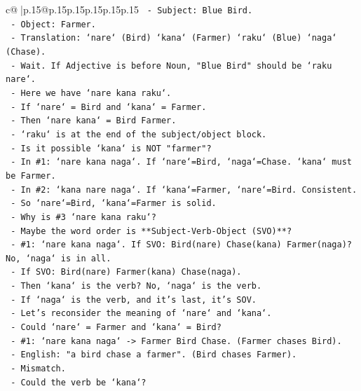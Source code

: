 \documentclass{article}
\begin{document}
{\begin{supertabular}{c@{$\;$}|p{.15\linewidth}@{}p{.15\linewidth}p{.15\linewidth}p{.15\linewidth}p{.15\linewidth}p{.15\linewidth}}
{{{\texttt{    {-} Subject: Blue Bird.} \\
\texttt{    {-} Object: Farmer.} \\
\texttt{    {-} Translation: `nare` (Bird) `kana` (Farmer) `raku` (Blue) `naga` (Chase).} \\
\texttt{    {-} Wait. If Adjective is before Noun, "Blue Bird" should be `raku nare`.} \\
\texttt{    {-} Here we have `nare kana raku`.} \\
\texttt{    {-} If `nare` = Bird and `kana` = Farmer.} \\
\texttt{    {-} Then `nare kana` = Bird Farmer.} \\
\texttt{    {-} `raku` is at the end of the subject/object block.} \\
\texttt{    {-} Is it possible `kana` is NOT "farmer"?} \\
\texttt{      {-} In \#1: `nare kana naga`. If `nare`=Bird, `naga`=Chase. `kana` must be Farmer.} \\
\texttt{      {-} In \#2: `kana nare naga`. If `kana`=Farmer, `nare`=Bird. Consistent.} \\
\texttt{    {-} So `nare`=Bird, `kana`=Farmer is solid.} \\
\texttt{    {-} Why is \#3 `nare kana raku`?} \\
\texttt{    {-} Maybe the word order is **Subject{-}Verb{-}Object (SVO)**?} \\
\texttt{      {-} \#1: `nare kana naga`. If SVO: Bird(nare) Chase(kana) Farmer(naga)? No, `naga` is in all.} \\
\texttt{      {-} If SVO: Bird(nare) Farmer(kana) Chase(naga).} \\
\texttt{        {-} Then `kana` is the verb? No, `naga` is the verb.} \\
\texttt{        {-} If `naga` is the verb, and it's last, it's SOV.} \\
\texttt{    {-} Let's reconsider the meaning of `nare` and `kana`.} \\
\texttt{      {-} Could `nare` = Farmer and `kana` = Bird?} \\
\texttt{        {-} \#1: `nare kana naga` {-}> Farmer Bird Chase. (Farmer chases Bird).} \\
\texttt{          {-} English: "a bird chase a farmer". (Bird chases Farmer).} \\
\texttt{          {-} Mismatch.} \\
\texttt{      {-} Could the verb be `kana`?} \\
}}}
\end{supertabular}}
\end{document}
